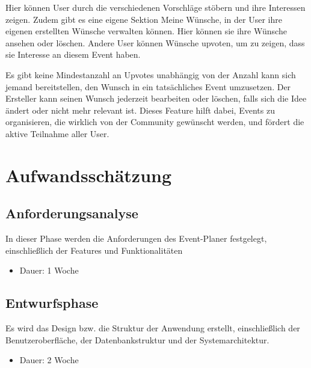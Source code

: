 \documentclass[a4paper,12pt]{article}
\begin{document}
Hier können User durch die verschiedenen Vorschläge stöbern und ihre Interessen zeigen. Zudem gibt es eine eigene Sektion Meine Wünsche, in der User ihre eigenen erstellten Wünsche verwalten können. Hier können sie ihre Wünsche ansehen oder löschen. Andere User können Wünsche upvoten, um zu zeigen, dass sie Interesse an diesem Event haben.

Es gibt keine Mindestanzahl an Upvotes unabhängig von der Anzahl kann sich jemand bereitstellen, den Wunsch in ein tatsächliches Event umzusetzen. Der Ersteller kann seinen Wunsch jederzeit bearbeiten oder löschen, falls sich die Idee ändert oder nicht mehr relevant ist. Dieses Feature hilft dabei, Events zu organisieren, die wirklich von der Community gewünscht werden, und fördert die aktive Teilnahme aller User.

\newpage


\section{Aufwandsschätzung}


\subsection{Anforderungsanalyse}
In dieser Phase werden die Anforderungen des Event-Planer festgelegt, einschließlich der Features und Funktionalitäten
\begin{itemize}
    \item Dauer: 1 Woche
\end{itemize}


\subsection{Entwurfsphase}
Es wird das Design bzw. die Struktur der Anwendung erstellt, einschließlich der Benutzeroberfläche, der Datenbankstruktur und der Systemarchitektur.
\begin{itemize}
    \item Dauer: 2 Woche
\end{itemize}
\end{document}
